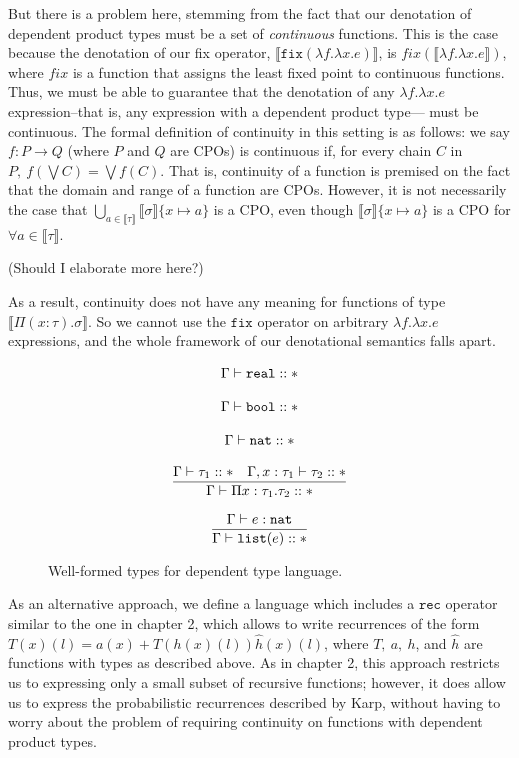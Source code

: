 But there is a problem here, stemming from the fact that our denotation of dependent product types must be a 
set of \emph{continuous} functions. This is the case because the denotation of our fix operator,
$\llbracket \texttt{fix}(\lambda f. \lambda x.e) \rrbracket$, is $fix(\llbracket \lambda f. \lambda x.e \rrbracket)$, where $fix$ 
is a function that assigns the least fixed point to continuous functions. Thus, we must be able to guarantee that the denotation of any $\lambda f. \lambda x.e$ expression--that is, any expression with a dependent product type--- must be continuous. The formal definition of continuity in this setting is as 
follows: we say $f: P \rightarrow Q$ (where $P$ and $Q$ are CPOs) is continuous if, for every chain $C$ in $P, \ 
f(\bigvee C) = \bigvee f(C)$. That is, continuity of a function is premised on the fact that the domain and range of
a function are CPOs. However, it is not necessarily the case that
 $\bigcup_{a \in \llbracket \tau \rrbracket} \llbracket \sigma \rrbracket\{ x \mapsto a\}$ is a CPO, even though 
 $\llbracket \sigma \rrbracket\{x\mapsto a\}$ is a CPO for $\forall a \in \llbracket \tau \rrbracket$.
 
(Should I elaborate more here?)

As a result, continuity does not have any meaning for functions of type $\llbracket \Pi (x: \tau).\sigma \rrbracket$. 
So we cannot use the $\texttt{fix}$ operator on arbitrary $\lambda f. \lambda x.e$ expressions, and the whole
framework of our denotational semantics falls apart. 
 
 \begin{figure}
\[
\begin{array}{c}
\Gamma \vdash \texttt{real} :: * \\ \\
\Gamma \vdash \texttt{bool} :: *\\ \\
\Gamma \vdash \texttt{nat} :: * \\ \\ 
\dfrac{\Gamma \vdash \tau_1 :: * \ \ \ \Gamma, x:\tau_1 \vdash \tau_2 :: *}{\Gamma \vdash \Pi x:\tau_1.\tau_2 :: *} \\ \\
\dfrac{\Gamma \vdash e : \texttt{nat}}{\Gamma \vdash \texttt{list}(e) :: *} 
\end{array}
\]
\caption{Well-formed types for dependent type language.}
\end{figure}

As an alternative approach, we define a language which includes a $\texttt{rec}$ operator similar to the one in chapter 2,
 which allows to write recurrences of the form $T(x)(l) = a(x) + T(h(x)(l))\hat{h}(x)(l)$, where $T, \ a, \ h$, and $\hat{h}$ 
 are functions with types as described above. As in chapter 2, this approach restricts us to expressing only a small subset
 of recursive functions; however, it does allow us to express the probabilistic recurrences described by Karp,
 without having to worry about the problem of requiring continuity on functions with dependent product types. 

